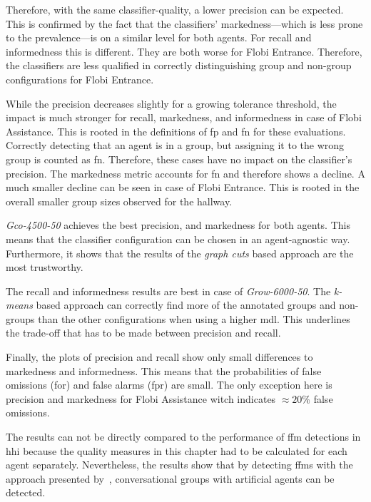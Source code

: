 \begin{enumerate*}[label=(\roman*)]
    Therefore, with the same classifier-quality, a lower precision can be expected.
    This is confirmed by the fact that the classifiers' \gls{markedness}---which is less prone to the \gls{prevalence}---is on a similar level for both agents.
    For \gls{recall} and \gls{informedness} this is different.
    They are both worse for \gls{Flobi Entrance}.
    Therefore, the classifiers are less qualified in correctly distinguishing group and non-group configurations for \gls{Flobi Entrance}.
    \item While the \gls{precision} decreases slightly for a growing \gls{tolerance threshold}, the impact is much stronger for \gls{recall}, \gls{markedness}, and \gls{informedness} in case of \gls{Flobi Assistance}.
    This is rooted in the definitions of \acrlong{fp} and \acrlong{fn} for these evaluations.
    Correctly detecting that an agent is in a group, but assigning it to the wrong group is counted as \acrlong{fn}.
    Therefore, these cases have no impact on the classifier's precision.
    The \gls{markedness} metric accounts for \acrlong{fn} and therefore shows a decline.
    A much smaller decline can be seen in case of \gls{Flobi Entrance}.
    This is rooted in the overall smaller group sizes observed for the hallway.
    \item \emph{Gco-4500-50} achieves the best \gls{precision}, and \gls{markedness} for both agents.
    This means that the classifier configuration can be chosen in an agent-agnostic way.
    Furthermore, it shows that the results of the \emph{graph cuts} based approach are the most trustworthy.
    \item The \gls{recall} and \gls{informedness} results are best in case of \emph{Grow-6000-50}.
    The \emph{k-means} based approach can correctly find more of the annotated groups and non-groups than the other configurations when using a higher \gls{mdl}.
    This underlines the trade-off that has to be made between \gls{precision} and \gls{recall}.
    \item Finally, the plots of \gls{precision} and \gls{recall} show only small differences to \gls{markedness} and \gls{informedness}.
    This means that the probabilities of false omissions (\gls{for}) and false alarms (\gls{fpr}) are small.
    The only exception here is \gls{precision} and \gls{markedness} for \gls{Flobi Assistance} witch indicates \(\approx20\%\) false omissions.
\end{enumerate*}
The results can not be directly compared to the performance of \gls{ffm} detections in \gls{hhi} \cite{Setti2015,Vascon2016} because the quality measures in this chapter had to be calculated for each agent separately.
Nevertheless, the results show that by detecting \glspl{ffm} with the approach presented by~, \glspl{conversational group} with \glspl{artificial agent} can be detected.

